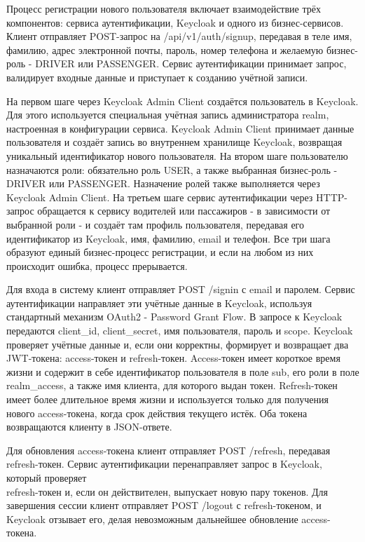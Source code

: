 {  \par \redline Процесс регистрации нового пользователя включает взаимодействие трёх компонентов: сервиса аутентификации, Keycloak и одного из бизнес-сервисов. Клиент отправляет POST-запрос на /api/v1/auth/signup, передавая в теле имя, фамилию, адрес электронной почты, пароль, номер телефона и желаемую бизнес-роль - DRIVER или PASSENGER. Сервис аутентификации принимает запрос, валидирует входные данные и приступает к созданию учётной записи.

  \par \redline На первом шаге через Keycloak Admin Client создаётся пользователь в Keycloak. Для этого используется специальная учётная запись администратора realm, настроенная в конфигурации сервиса. Keycloak Admin Client принимает данные пользователя и создаёт запись во внутреннем хранилище Keycloak, возвращая уникальный идентификатор нового пользователя. На втором шаге пользователю назначаются роли: обязательно роль USER, а также выбранная бизнес-роль - DRIVER или PASSENGER. Назначение ролей также выполняется через Keycloak Admin Client. На третьем шаге сервис аутентификации через HTTP-запрос обращается к сервису водителей или пассажиров - в зависимости от выбранной роли - и создаёт там профиль пользователя, передавая его идентификатор из Keycloak, имя, фамилию, email и телефон. Все три шага образуют единый бизнес-процесс регистрации, и если на любом из них происходит ошибка, процесс прерывается.

  \par \redline Для входа в систему клиент отправляет POST /signin с email и паролем. Сервис аутентификации направляет эти учётные данные в Keycloak, используя стандартный механизм OAuth2 - Password Grant Flow. В запросе к Keycloak передаются client\_id, client\_secret, имя пользователя, пароль и scope. Keycloak проверяет учётные данные и, если они корректны, формирует и возвращает два JWT-токена: access-токен и refresh-токен. Access-токен имеет короткое время жизни и содержит в себе идентификатор пользователя в поле sub, его роли в поле realm\_access, а также имя клиента, для которого выдан токен. Refresh-токен имеет более длительное время жизни и используется только для получения нового access-токена, когда срок действия текущего истёк. Оба токена возвращаются клиенту в JSON-ответе.

  \par \redline Для обновления access-токена клиент отправляет POST /refresh, передавая refresh-токен. Сервис аутентификации перенаправляет запрос в Keycloak, который проверяет \\refresh-токен и, если он действителен, выпускает новую пару токенов. Для завершения сессии клиент отправляет POST /logout с refresh-токеном, и Keycloak отзывает его, делая невозможным дальнейшее обновление access-токена.

}
